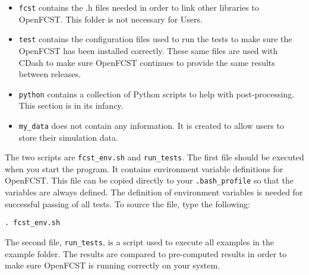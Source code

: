 \begin{itemize}
 \item \texttt{fcst} contains the .h files needed in order to link other libraries to OpenFCST. This folder is not necessary for Users.
 \item \texttt{test} contains the configuration files used to run the tests to make sure the OpenFCST has been installed correctly. These same files are used with CDash to make sure OpenFCST continues to provide the same results between releases.
 \item \texttt{python} contains a collection of Python scripts to help with post-processing. This section is in its infancy.
 \item \texttt{my\_data} does not contain any information. It is created to allow users to store their simulation data.
\end{itemize}

The two scripts are \texttt{fcst\_env.sh} and \texttt{run\_tests}. The first file should be executed when you start the program. It contains environment variable definitions for OpenFCST. This file can be copied directly to your \texttt{.bash\_profile} so that the variables are always defined. The definition of environment variables is needed for successful passing of all tests. To source the file, type the following:
\begin{lstlisting}
. fcst_env.sh
\end{lstlisting}
The second file, \texttt{run\_tests}, is a script used to execute all examples in the example folder. The results are compared to pre-computed results in order to make sure OpenFCST is running correctly on your system.

